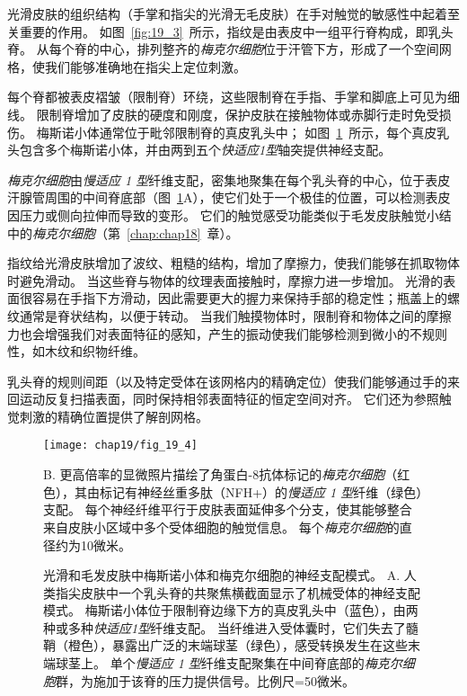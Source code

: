 \begin{proposition}[指纹结构提高了手部的触觉敏感性] \label{box:19_1}
	
	\quad \quad 光滑皮肤的组织结构（手掌和指尖的光滑无毛皮肤）在手对触觉的敏感性中起着至关重要的作用。
	如图~\ref{fig:19_3}~所示，指纹是由表皮中一组平行脊构成，即乳头脊。
	从每个脊的中心，排列整齐的\textit{梅克尔细胞}位于汗管下方，形成了一个空间网格，使我们能够准确地在指尖上定位刺激。
	
	\quad \quad 每个脊都被表皮褶皱（限制脊）环绕，这些限制脊在手指、手掌和脚底上可见为细线。
	限制脊增加了皮肤的硬度和刚度，保护皮肤在接触物体或赤脚行走时免受损伤。
	梅斯诺小体通常位于毗邻限制脊的真皮乳头中；
	如图~\ref{fig:19_4}~所示，每个真皮乳头包含多个梅斯诺小体，并由两到五个\textit{快适应1型}轴突提供神经支配。
	
	\quad \quad \textit{梅克尔细胞}由\textit{慢适应 1 型}纤维支配，密集地聚集在每个乳头脊的中心，位于表皮汗腺管周围的中间脊底部（图~\ref{fig:19_4}A），使它们处于一个极佳的位置，可以检测表皮因压力或侧向拉伸而导致的变形。
	它们的触觉感受功能类似于毛发皮肤触觉小结中的\textit{梅克尔细胞}（第~\ref{chap:chap18}~章）。
	
	\quad \quad 指纹给光滑皮肤增加了波纹、粗糙的结构，增加了摩擦力，使我们能够在抓取物体时避免滑动。
	当这些脊与物体的纹理表面接触时，摩擦力进一步增加。
	光滑的表面很容易在手指下方滑动，因此需要更大的握力来保持手部的稳定性；瓶盖上的螺纹通常是脊状结构，以便于转动。
	当我们触摸物体时，限制脊和物体之间的摩擦力也会增强我们对表面特征的感知，产生的振动使我们能够检测到微小的不规则性，如木纹和织物纤维。
	
	\quad \quad 乳头脊的规则间距（以及特定受体在该网格内的精确定位）使我们能够通过手的来回运动反复扫描表面，同时保持相邻表面特征的恒定空间对齐。
	它们还为参照触觉刺激的精确位置提供了解剖网格。
	
\end{proposition}


\begin{figure}[htbp]
	\centering
	\texttt{[image: chap19/fig\_19\_4]}
	\caption{光滑和毛发皮肤中梅斯诺小体和梅克尔细胞的神经支配模式。
		A. 人类指尖皮肤中一个乳头脊的共聚焦横截面显示了机械受体的神经支配模式。
		梅斯诺小体位于限制脊边缘下方的真皮乳头中（蓝色），由两种或多种\textit{快适应1型}纤维支配。
		当纤维进入受体囊时，它们失去了髓鞘（橙色），暴露出广泛的末端球茎（绿色），感受转换发生在这些末端球茎上。
		单个\textit{慢适应 1 型}纤维支配聚集在中间脊底部的\textit{梅克尔细胞}群，为施加于该脊的压力提供信号。比例尺=50微米。}
		B. 更高倍率的显微照片描绘了角蛋白-8抗体标记的\textit{梅克尔细胞}（红色），其由标记有神经丝重多肽（NFH+）的\textit{慢适应 1 型}纤维（绿色）支配。
		每个神经纤维平行于皮肤表面延伸多个分支，使其能够整合来自皮肤小区域中多个受体细胞的触觉信息。
		每个\textit{梅克尔细胞}的直径约为10微米。
	\label{fig:19_4}
\end{figure}


